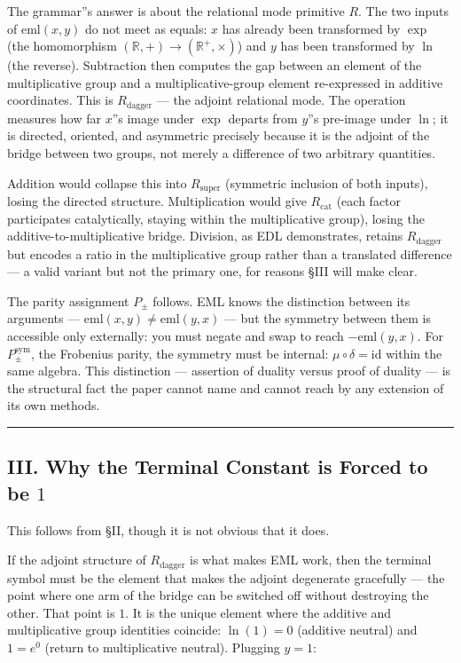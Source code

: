 \documentclass[12pt,a4paper]{article}
\newcommand{\pilcrow}{\S}
\begin{document}
The grammar''s answer is about the relational mode primitive $R$. The two inputs of
$\text{eml}(x,y)$ do not meet as equals: $x$ has already been transformed by
$\exp$ (the homomorphism $(\mathbb{R},+) \to (\mathbb{R}^+,\times)$) and $y$ has
been transformed by $\ln$ (the reverse). Subtraction then computes the gap between
an element of the multiplicative group and a multiplicative-group element
re-expressed in additive coordinates. This is $R_\text{dagger}$ --- the adjoint
relational mode. The operation measures how far $x$''s image under $\exp$ departs
from $y$''s pre-image under $\ln$; it is directed, oriented, and asymmetric
precisely because it is the adjoint of the bridge between two groups, not merely
a difference of two arbitrary quantities.

Addition would collapse this into $R_\text{super}$ (symmetric inclusion of both
inputs), losing the directed structure. Multiplication would give $R_\text{cat}$
(each factor participates catalytically, staying within the multiplicative group),
losing the additive-to-multiplicative bridge. Division, as EDL demonstrates,
retains $R_\text{dagger}$ but encodes a ratio in the multiplicative group rather
than a translated difference --- a valid variant but not the primary one, for reasons
\pilcrow{}III will make clear.

The parity assignment $P_{\pm}$ follows. EML knows the distinction between its
arguments --- $\text{eml}(x,y) \neq \text{eml}(y,x)$ --- but the symmetry between
them is accessible only externally: you must negate and swap to reach
$-\text{eml}(y,x)$. For $P_{\pm}^{\text{sym}}$, the Frobenius parity, the
symmetry must be internal: $\mu \circ \delta = \text{id}$ within the same algebra.
This distinction --- assertion of duality versus proof of duality --- is the structural
fact the paper cannot name and cannot reach by any extension of its own methods.

\begin{center}
\rule{0.5\textwidth}{0.4pt}
\end{center}

\subsection{III. Why the Terminal Constant is Forced to be $1$}

This follows from \pilcrow{}II, though it is not obvious that it does.

If the adjoint structure of $R_\text{dagger}$ is what makes EML work, then the
terminal symbol must be the element that makes the adjoint degenerate gracefully
--- the point where one arm of the bridge can be switched off without destroying
the other. That point is $1$. It is the unique element where the additive and
multiplicative group identities coincide: $\ln(1) = 0$ (additive neutral) and
$1 = e^0$ (return to multiplicative neutral). Plugging $y = 1$:
\end{document}

